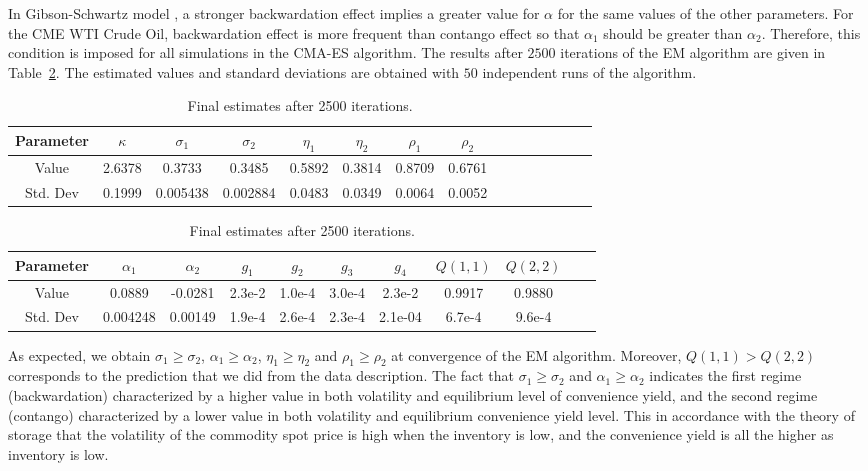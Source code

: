 \documentclass[nolayout]{article}
\theoremstyle{plain}
\theoremstyle{definition}
\newcommand{\1}{\mathbbm{1}}
\begin{document}
In Gibson-Schwartz model \cite{gibson:schwartz:1990}, a stronger backwardation effect implies a greater value for $\alpha$ for the same values of the other parameters. For the CME WTI Crude Oil, backwardation effect is more frequent than contango effect so that $\alpha_1$ should be greater than $\alpha_2$. Therefore, this condition is imposed for all simulations in the CMA-ES algorithm. The results after $2500$ iterations of the EM algorithm are given in Table~\ref{fig:CMEfinalestimates}. The estimated values and standard deviations are obtained with $50$ independent runs of the algorithm.
\begin{table}[h!]
	\centering
	\begin{tabular}{||c|c|c|c|c|c|c|c|c||c|clc|c|c||}
	\hline
		Parameter&  $\kappa$ & $\sigma_1$ & $\sigma_2$ & $\eta_1$ & $\eta_2$ & $\rho_1$ & $\rho_2$  \\
		\hline
		Value & 2.6378 &0.3733 & 0.3485 & 0.5892 & 0.3814 & 0.8709 & 0.6761   \\
		\hline
		Std. Dev & 0.1999 & 0.005438 & 0.002884 & 0.0483 & 0.0349 & 0.0064 & 0.0052 \\  
		\hline
	\end{tabular}
	
	\vspace{.2cm}
	
	\begin{tabular}{||c|c|c|c|c|c|c|c|c|c|c|||}
	\hline
		Parameter & $\alpha_1$ & $\alpha_2$  & $g_1$ & $g_2$ & $g_3$ & $g_4$  & $Q(1,1)$ & $Q(2,2)$\\
		\hline
		Value & 0.0889 & -0.0281  & 2.3e-2 & 1.0e-4 & 3.0e-4 & 2.3e-2 & 0.9917 & 0.9880 \\
		\hline
		Std. Dev & 0.004248 & 0.00149 & 1.9e-4 & 2.6e-4 & 2.3e-4 & 2.1e-04 &  6.7e-4 & 9.6e-4\\
		\hline
	\end{tabular}
	\caption{Final estimates after 2500 iterations.}
	\label{fig:CMEfinalestimates}
\end{table}
As expected, we obtain $\sigma_1 \geq \sigma_2$, $\alpha_1 \geq \alpha_2$, $\eta_1 \geq \eta_2$ and $\rho_1 \geq \rho_2$ at convergence of the EM algorithm. Moreover, $Q(1,1) > Q(2,2)$ corresponds to the prediction that we did from the data description. The fact that $\sigma_1 \geq \sigma_2$ and $\alpha_1 \geq \alpha_2$ indicates the first regime (backwardation) characterized by a higher value in both volatility and equilibrium level of convenience yield, and the second regime (contango) characterized by a lower value in both volatility and equilibrium convenience yield level. This in accordance with the theory of storage that the volatility of the commodity spot price is high when the inventory is low, and the convenience yield is all the higher as inventory is low.
\end{document}
